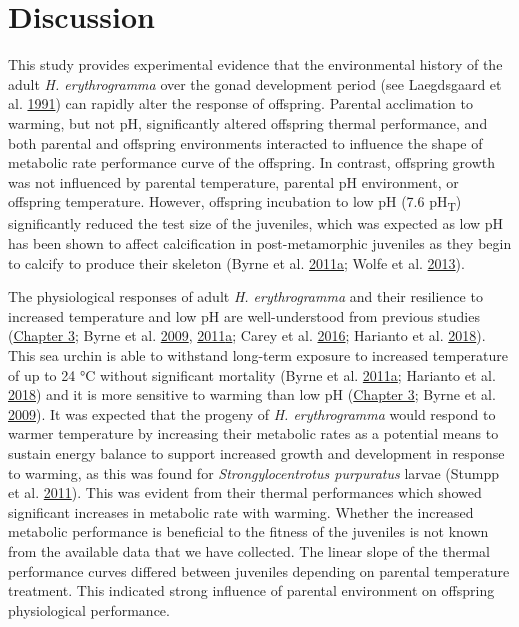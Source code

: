 \documentclass[a4paper,10pt, oneside]{memoir}
\begin{document}
\hypertarget{discussion-2}{%
\section{Discussion}\label{discussion-2}}

This study provides experimental evidence that the environmental history of the adult \emph{H. erythrogramma} over the gonad development period (see Laegdsgaard et al. \protect\hyperlink{ref-Laegdsgaard1991}{1991}) can rapidly alter the response of offspring.
Parental acclimation to warming, but not pH, significantly altered offspring thermal performance, and both parental and offspring environments interacted to influence the shape of metabolic rate performance curve of the offspring.
In contrast, offspring growth was not influenced by parental temperature, parental pH environment, or offspring temperature.
However, offspring incubation to low pH (7.6 pH\textsubscript{T}) significantly reduced the test size of the juveniles, which was expected as low pH has been shown to affect calcification in post-metamorphic juveniles as they begin to calcify to produce their skeleton (Byrne et al. \protect\hyperlink{ref-Byrne2011}{2011}\protect\hyperlink{ref-Byrne2011}{a}; Wolfe et al. \protect\hyperlink{ref-Wolfe2013}{2013}).

The physiological responses of adult \emph{H. erythrogramma} and their resilience to increased temperature and low pH are well-understood from previous studies (\protect\hyperlink{multistressor}{Chapter 3}; Byrne et al. \protect\hyperlink{ref-Byrne2009}{2009}, \protect\hyperlink{ref-Byrne2011}{2011}\protect\hyperlink{ref-Byrne2011}{a}; Carey et al. \protect\hyperlink{ref-Carey2016}{2016}; Harianto et al. \protect\hyperlink{ref-Harianto2018}{2018}).
This sea urchin is able to withstand long-term exposure to increased temperature of up to 24 °C without significant mortality (Byrne et al. \protect\hyperlink{ref-Byrne2011}{2011}\protect\hyperlink{ref-Byrne2011}{a}; Harianto et al. \protect\hyperlink{ref-Harianto2018}{2018}) and it is more sensitive to warming than low pH (\protect\hyperlink{multistressor}{Chapter 3}; Byrne et al. \protect\hyperlink{ref-Byrne2009}{2009}).
It was expected that the progeny of \emph{H. erythrogramma} would respond to warmer temperature by increasing their metabolic rates as a potential means to sustain energy balance to support increased growth and development in response to warming, as this was found for \emph{Strongylocentrotus purpuratus} larvae (Stumpp et al. \protect\hyperlink{ref-Stumpp2011}{2011}).
This was evident from their thermal performances which showed significant increases in metabolic rate with warming.
Whether the increased metabolic performance is beneficial to the fitness of the juveniles is not known from the available data that we have collected.
The linear slope of the thermal performance curves differed between juveniles depending on parental temperature treatment.
This indicated strong influence of parental environment on offspring physiological performance.
\end{document}
